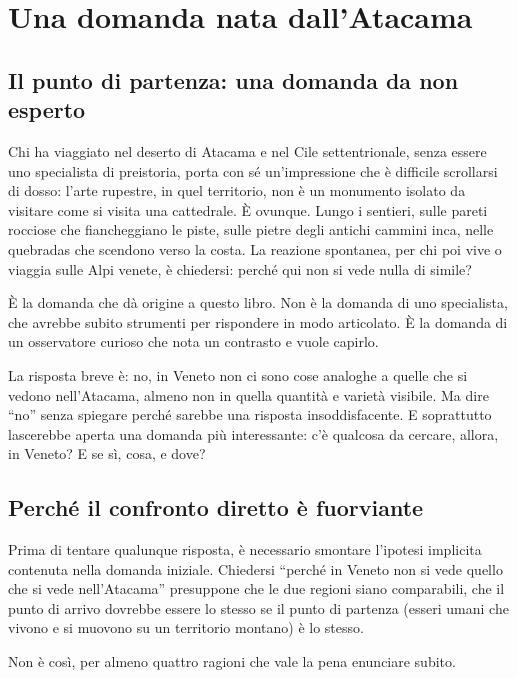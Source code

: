 \chapter{Una domanda nata dall'Atacama}
\label{cap:due_paesaggi}

\section{Il punto di partenza: una domanda da non esperto}

Chi ha viaggiato nel deserto di Atacama e nel Cile settentrionale, senza essere uno specialista di preistoria, porta con sé un'impressione che è difficile scrollarsi di dosso: l'arte rupestre, in quel territorio, non è un monumento isolato da visitare come si visita una cattedrale. È ovunque. Lungo i sentieri, sulle pareti rocciose che fiancheggiano le piste, sulle pietre degli antichi cammini inca, nelle quebradas che scendono verso la costa. La reazione spontanea, per chi poi vive o viaggia sulle Alpi venete, è chiedersi: perché qui non si vede nulla di simile?

È la domanda che dà origine a questo libro. Non è la domanda di uno specialista, che avrebbe subito strumenti per rispondere in modo articolato. È la domanda di un osservatore curioso che nota un contrasto e vuole capirlo.

La risposta breve è: no, in Veneto non ci sono cose analoghe a quelle che si vedono nell'Atacama, almeno non in quella quantità e varietà visibile. Ma dire ``no'' senza spiegare perché sarebbe una risposta insoddisfacente. E soprattutto lascerebbe aperta una domanda più interessante: c'è qualcosa da cercare, allora, in Veneto? E se sì, cosa, e dove?

\section{Perché il confronto diretto è fuorviante}

Prima di tentare qualunque risposta, è necessario smontare l'ipotesi implicita contenuta nella domanda iniziale. Chiedersi ``perché in Veneto non si vede quello che si vede nell'Atacama'' presuppone che le due regioni siano comparabili, che il punto di arrivo dovrebbe essere lo stesso se il punto di partenza (esseri umani che vivono e si muovono su un territorio montano) è lo stesso.

Non è così, per almeno quattro ragioni che vale la pena enunciare subito.

